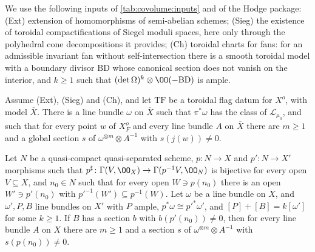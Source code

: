 We use the following inputs of \cref{tab:covolume:inputs} and of the Hodge package: (Ext) extension of
homomorphisms of semi-abelian schemes; (Sieg) the existence of toroidal compactifications of Siegel
moduli spaces, here only through the polyhedral cone decompositions it provides; (Ch) toroidal charts
for fans: for an admissible invariant fan without self-intersection there is a smooth toroidal model with
a boundary divisor $\mathrm{BD}$ whose canonical section does not vanish on the interior, and $k\ge1$
such that $(\det\Omega)^k\otimes\OO(-\mathrm{BD})$ is ample.

\begin{theorem}\label{pf:lift1:hodge-thm}
Assume (Ext), (Sieg) and (Ch), and let $\mathrm{TF}$ be a toroidal flag datum for $X^o$, with model
$\overline X$. There is a line bundle $\omega$ on $\overline X$ such that $\pi^*\omega$ has the class of
$\mathcal L_{\mu_0}$, and such that for every point $w$ of $X^o_F$ and every line bundle $A$ on
$\overline X$ there are $m\ge1$ and a global section $s$ of $\omega^{\otimes m}\otimes A^{-1}$ with
$s(j(w))\ne0$.
\end{theorem}

\begin{lemma}\label{pf:lift1:common}
Let $N$ be a quasi-compact quasi-separated scheme, $p\colon N\to X$ and $p'\colon N\to X'$ morphisms such
that $p^\sharp\colon\Gamma(V,\OO_X)\to\Gamma(p^{-1}V,\OO_N)$ is bijective for every open $V\subseteq X$,
and $n_0\in N$ such that for every open $W\ni p(n_0)$ there is an open $W'\ni p'(n_0)$ with
$p'^{-1}(W')\subseteq p^{-1}(W)$. Let $\omega$ be a line bundle on $X$, and $\omega',P,B$ line bundles on
$X'$ with $P$ ample, $p^*\omega\cong p'^*\omega'$, and $[P]+[B]=k[\omega']$ for some $k\ge1$. If $B$ has a
section $b$ with $b(p'(n_0))\ne0$, then for every line bundle $A$ on $X$ there are $m\ge1$ and a section
$s$ of $\omega^{\otimes m}\otimes A^{-1}$ with $s(p(n_0))\ne0$.
\end{lemma}

